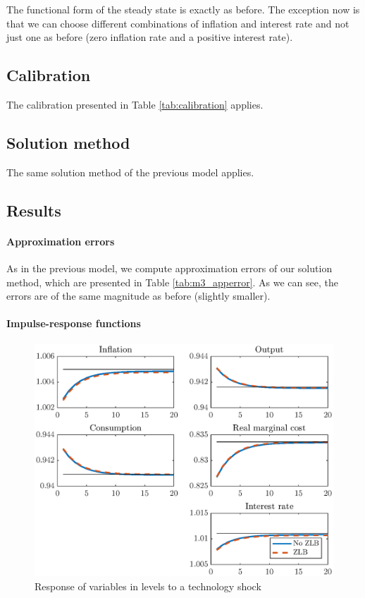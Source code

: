\documentclass[12pt]{article}
\numberwithin{equation}{section}
\begin{document}
The functional form of the steady state is exactly as before. The exception now is that we can choose different combinations of inflation and interest rate and not just one as before (zero inflation rate and a positive interest rate).

\subsection{Calibration}

The calibration presented in Table \ref{tab:calibration} applies.

\subsection{Solution method}

The same solution method of the previous model applies.

\subsection{Results}

\paragraph{Approximation errors} As in the previous model, we compute approximation errors of our solution method, which are presented in Table \ref{tab:m3_apperror}. As we can see, the errors are of the same magnitude as before (slightly smaller).



\paragraph{Impulse-response functions} 

\begin{figure}[H]
	\centering
	\caption{Response of variables in levels to a technology shock}\label{fig:m2_irfLevel_tfp}
	\includegraphics[scale=0.7]{m3_irfLevel_tfp}
\end{figure}
\end{document}
